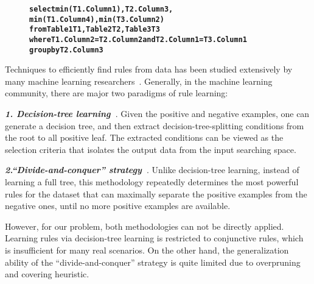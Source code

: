 \begin{figure}[t]
\begin{CodeOut}
\begin{alltt}
\textbf{select min(T1.Column1), T2.Column3,
       min(T1.Column4), min(T3.Column2)
from Table1 T1, Table2 T2, Table3 T3
where T1.Column2 = T2.Column2 and T2.Column1 = T3.Column1
group by T2.Column3}
\end{alltt}
\end{CodeOut}
\vspace{-5mm}
\end{figure}


Techniques to efficiently find rules from data has been studied extensively
by many machine learning researchers~\cite{Quinlan:1993, Cohen:1995, Frank:1998}.
Generally, in the machine learning community, there are major two paradigms of
rule learning:

\vspace{1mm}
\noindent\textbf{\textit{1. Decision-tree learning~\cite{Quinlan:1993}}}. Given
the positive and negative examples, one can generate a decision
tree, and then extract decision-tree-splitting conditions from the root to
all positive leaf. The extracted conditions can be viewed as the selection
criteria that isolates the output data from the input searching space.


\vspace{1mm}
\noindent\textbf{\textit{2.``Divide-and-conquer'' strategy~\cite{Pagallo:1990}}}. 
Unlike decision-tree learning, instead of learning a full tree,
this methodology repeatedly determines the most powerful rules for the dataset
that can maximally separate the positive examples from the negative ones, until
no more positive examples are available.

\vspace{1mm}

However, for our problem, both methodologies can not be directly applied.
Learning rules via decision-tree learning is restricted to conjunctive rules,
which is insufficient for many real scenarios. On the
other hand, the generalization ability of the ``divide-and-conquer'' strategy
is quite limited due to overpruning and covering heuristic.
